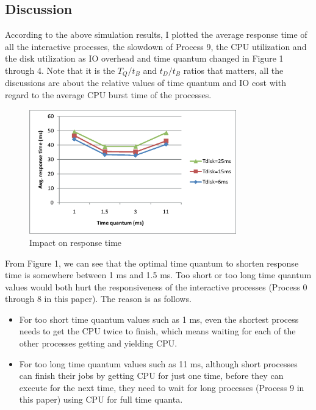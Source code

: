 \documentclass[12pt,letterpaper]{article}
\begin{document}
\subsection{Discussion}
According to the above simulation results, I plotted the average response time of all the interactive processes, the slowdown of Process 9, the CPU utilization and the disk utilization as IO overhead and time quantum changed in Figure 1 through 4. Note that it is the $T_Q/t_B$ and $t_D/t_B$ ratios that matters, all the discussions are about the relative values of time quantum and IO cost with regard to the average CPU burst time of the processes.

\begin{figure}[h]
\begin{center}
\includegraphics[width=0.8\textwidth]{responseTime.eps}
\caption{Impact on response time}
\end{center}
\end{figure}

From Figure 1, we can see that the optimal time quantum to shorten response time is somewhere between 1 ms and 1.5 ms. Too short or too long time quantum values would both hurt the responsiveness of the interactive processes (Process 0 through 8 in this paper). The reason is as follows.

\begin{itemize}
\item For too short time quantum values such as 1 ms, even the shortest process needs to get the CPU twice to finish, which means waiting for each of the other processes getting and yielding CPU.
\item For too long time quantum values such as 11 ms, although short processes can finish their jobs by getting CPU for just one time, before they can execute for the next time, they need to wait for long processes (Process 9 in this paper) using CPU for full time quanta.
\end{itemize}
\end{document}

